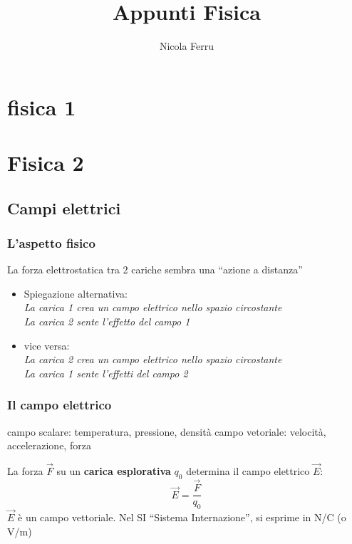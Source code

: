 \documentclass{book}
\title{Appunti Fisica}
\author{Nicola Ferru}
\date{}
\begin{document}
\maketitle
\tableofcontents
\listoftables
\listoffigures


\part{fisica 1}



\part {Fisica 2}


\chapter{Campi elettrici}
\section {L'aspetto fisico}
La forza elettrostatica tra 2 cariche sembra una ``azione a distanza''
\begin{itemize}
\item Spiegazione alternativa:\\
  \textit{La carica 1 crea un campo elettrico nello spazio circostante}\\
  \textit{La carica 2 sente l'effetto del campo 1}\\
\item vice versa:\\
  \textit{La carica 2 crea un campo elettrico nello spazio circostante}\\
  \textit{La carica 1 sente l'effetti del campo 2}
\end{itemize}
\section {Il campo elettrico}
\begin{tasks}{2}
\task campo scalare: temperatura, pressione, densità
\task campo vetoriale: velocità, accelerazione, forza
\end{tasks}
La forza $\vec{F}$ su un \textbf{carica esplorativa} $q_0$ determina il campo elettrico $\vec{E}$:
\begin{equation}
  \vec{E}=\frac{\vec{F}}{q_0}
\end{equation}
$\vec{E}$ è un campo vettoriale. Nel SI ``Sistema Internazione'', si esprime in N/C (o V/m)
\end{document}
